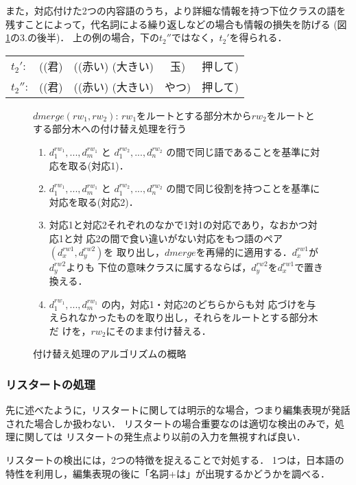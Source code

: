 また，対応付けた2つの内容語のうち，より詳細な情報を持つ下位クラスの語を
残すことによって，代名詞による繰り返しなどの場合も情報の損失を防げる
(図\ref{fig:DMERGE}の3.の後半)．
上の例の場合，下の$t_2''$ではなく，$t_2'$を得られる．
\begin{center}
\begin{tabular}{lcccc}
$t_2'$:& ((君) & ((赤い) (大きい) & 玉) & 押して)\\
$t_2''$:& ((君) & ((赤い) (大きい) & やつ) & 押して)\\
\end{tabular}
\end{center}



\begin{figure}
\small
$dmerge(rw_1, rw_2)$: $rw_1$をルートとする部分木から$rw_2$をルートとする部分木への付け替え処理を行う
\begin{enumerate}
\item $d_1^{rw_1}, ... , d_m^{rw_1}$ と $d_1^{rw_2}, ... , d_n^{rw_2}$ 
  の間で同じ語であることを基準に対応を取る(対応1)．
\item $d_1^{rw_1}, ... , d_m^{rw_1}$ と $d_1^{rw_2}, ... , d_n^{rw_2}$
  の間で同じ役割を持つことを基準に対応を取る(対応2)．
\item 対応1と対応2それぞれのなかで1対1の対応であり，なおかつ対応1と対
  応2の間で食い違いがない対応をもつ語のペア$(d_x^{rw1}, d_y^{rw2})$を
  取り出し，$dmerge$を再帰的に適用する．$d_x^{rw1}$が$d_y^{rw2}$よりも
下位の意味クラスに属するならば，$d_y^{rw2}$を$d_x^{rw1}$で置き換える．
\item $d_1^{rw_1}, ... ,d_m^{rw_1}$ の内，対応1・対応2のどちらからも対
  応づけを与えられなかったものを取り出し，それらをルートとする部分木だ
  けを，$rw_2$にそのまま付け替える．
\end{enumerate}
\caption{付け替え処理のアルゴリズムの概略}
\label{fig:DMERGE}
\end{figure}

\subsubsection{リスタートの処理}
先に述べたように，リスタートに関しては明示的な場合，つまり編集表現が発話された場合しか扱わない．
リスタートの場合重要なのは適切な検出のみで，処理に関しては
リスタートの発生点より以前の入力を無視すれば良い．

リスタートの検出には，2つの特徴を捉えることで対処する．
1つは，日本語の特性を利用し，編集表現の後に「名詞+は」が出現するかどうかを調べる．

